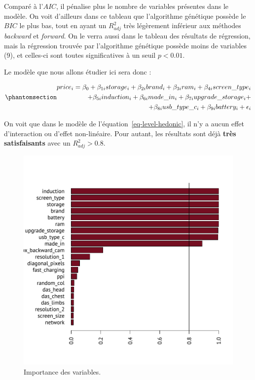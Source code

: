 \documentclass[
  12pt,
]{report}
\begin{document}
Comparé à l'\(AIC\), il pénalise plus le nombre de variables présentes
dans le modèle. On voit d'ailleurs dans ce tableau que l'algorithme
génétique possède le \(BIC\) le plus bas, tout en ayant un \(R^2_{adj}\)
très légèrement inférieur aux méthodes \emph{backward} et
\emph{forward}. On le verra aussi dans le tableau des résultats de
régression, mais la régression trouvée par l'algorithme génétique
possède moins de variables (9), et celles-ci sont toutes significatives
à un seuil \(p<0.01\).

Le modèle que nous allons étudier ici sera donc :

\begin{equation}\phantomsection\label{eq-level-hedonic}{
\begin{split}
price_i = \beta_0 + \beta_{1i} storage_i + \beta_{2i}brand_i + \beta_{3i}ram_i + \beta_{4i}screen\_type_i \\
+ \beta_{5i}induction_i + \beta_{6i}made\_in_i + \beta_{7i}upgrade\_storage_i + \\ 
+ \beta_{8i}usb\_type\_c_i  + \beta_{9i}battery_i + \epsilon_i
\end{split}
}\end{equation}

On voit que dans le modèle de l'équation~\ref{eq-level-hedonic}, il n'y
a aucun effet d'interaction ou d'effet non-linéaire. Pour autant, les
résultats sont déjà \textbf{très satisfaisants} avec un
\(R^2_{adj} > 0.8\).

\newpage

\begin{figure}[H]

{\centering \includegraphics{report_files/figure-pdf/var_importance-1.pdf}

}

\caption{Importance des variables.}

\end{figure}%
\end{document}
